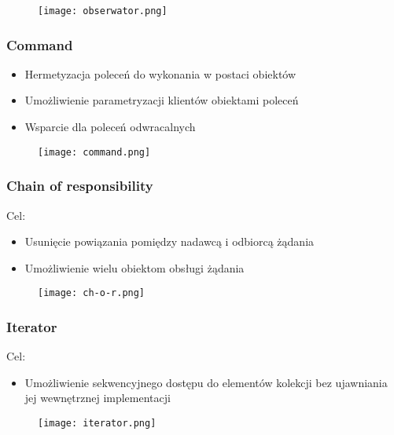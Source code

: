 \documentclass[a4paper]{article}
\begin{document}
\begin{figure}[!h]
    \texttt{[image: obserwator.png]}
\end{figure}


\subsubsection{Command}
    \begin{itemize}
        \item Hermetyzacja poleceń do wykonania w postaci obiektów
        \item Umożliwienie parametryzacji klientów obiektami poleceń
        \item Wsparcie dla poleceń odwracalnych
    \end{itemize}

\begin{figure}[!h]
    \texttt{[image: command.png]}
\end{figure}


    \subsubsection{Chain of responsibility}
    Cel:
    \begin{itemize}
        \item  Usunięcie powiązania pomiędzy nadawcą i odbiorcą żądania
        \item Umożliwienie wielu obiektom obsługi żądania
    \end{itemize}


\begin{figure}[!h]
    \texttt{[image: ch-o-r.png]}
\end{figure}


    \subsubsection{Iterator}
    Cel:
    \begin{itemize}
        \item Umożliwienie sekwencyjnego dostępu do elementów kolekcji bez
        ujawniania jej wewnętrznej implementacji
    \end{itemize}





\begin{figure}[!h]
    \texttt{[image: iterator.png]}
\end{figure}
\end{document}
